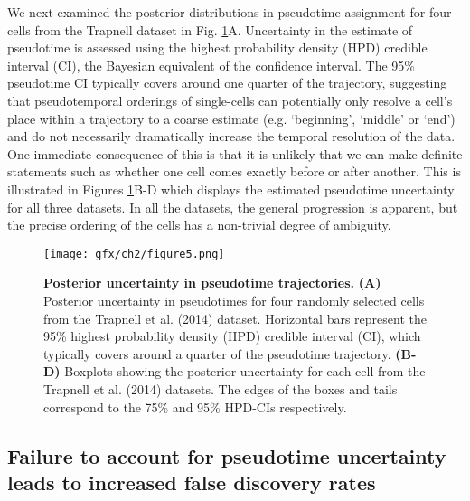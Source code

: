 We next examined the posterior distributions in pseudotime assignment for four cells from the Trapnell dataset in Fig. \ref{fig:posuncert}A. Uncertainty in the estimate of pseudotime is assessed using the highest probability density (HPD) credible interval (CI), the Bayesian equivalent of the confidence interval. The 95\% pseudotime CI typically covers around one quarter of the trajectory, suggesting that pseudotemporal orderings of single-cells can potentially only resolve a cell's place within a trajectory to a coarse estimate (e.g. `beginning', `middle' or `end') and do not necessarily dramatically increase the temporal resolution of the data. One immediate consequence of this is that it is unlikely that we can make definite statements such as whether one cell comes exactly before or after another. This is illustrated in Figures \ref{fig:posuncert}B-D which displays the estimated pseudotime uncertainty for all three datasets. In all the datasets, the general progression is apparent, but the precise ordering of the cells has a non-trivial degree of ambiguity.

\begin{figure}
\centering
	\texttt{[image: gfx/ch2/figure5.png]}
    \caption{ {\bf  Posterior uncertainty in pseudotime trajectories. } \textbf{(A)} Posterior uncertainty in pseudotimes for four randomly selected cells from the Trapnell et al. (2014) dataset. Horizontal bars represent the 95\% highest probability density (HPD) credible interval (CI), which typically covers around a quarter of the pseudotime trajectory. \textbf{(B-D)} Boxplots showing the posterior uncertainty for each cell from the Trapnell et al. (2014) datasets. The edges of the boxes and tails correspond to the 75\% and 95\% HPD-CIs respectively.} \label{fig:posuncert}
\end{figure}


\subsection{Failure to account for pseudotime uncertainty leads to increased false discovery rates}

